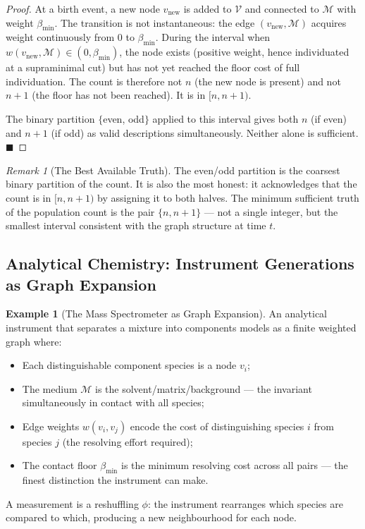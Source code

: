 \documentclass[11pt,twocolumn,a4paper]{article}
\theoremstyle{plain}
\theoremstyle{definition}
\newtheorem{example}[theorem]{Example}
\theoremstyle{remark}
\newtheorem{remark}[theorem]{Remark}
\newcommand{\med}{\mathcal{M}}
\newcommand{\Vcal}{\mathcal{V}}
\newcommand{\bmin}{\beta_{\min}}
\renewcommand{\qed}{\hfill$\blacksquare$}
\begin{document}
\begin{proof}
At a birth event, a new node $v_{\mathrm{new}}$ is added to $\Vcal$ and
connected to $\med$ with weight $\bmin$. The transition is not instantaneous:
the edge $(v_{\mathrm{new}}, \med)$ acquires weight continuously from $0$ to
$\bmin$. During the interval when $w(v_{\mathrm{new}}, \med) \in (0, \bmin)$,
the node exists (positive weight, hence individuated at a supraminimal cut)
but has not yet reached the floor cost of full individuation. The count is
therefore not $n$ (the new node is present) and not $n+1$ (the floor has not
been reached). It is in $[n, n+1)$.

The binary partition $\{$even, odd$\}$ applied to this interval gives both
$n$ (if even) and $n+1$ (if odd) as valid descriptions simultaneously.
Neither alone is sufficient. \qed
\end{proof}

\begin{remark}[The Best Available Truth]
\label{rem:count_truth}
The even/odd partition is the coarsest binary partition of the count. It is
also the most honest: it acknowledges that the count is in $[n, n+1)$ by
assigning it to both halves. The minimum sufficient truth of the population
count is the pair $\{n, n+1\}$ --- not a single integer, but the smallest
interval consistent with the graph structure at time $t$.
\end{remark}

\subsection{Analytical Chemistry: Instrument Generations as Graph Expansion}

\begin{example}[The Mass Spectrometer as Graph Expansion]
\label{ex:ms}
An analytical instrument that separates a mixture into components models as
a finite weighted graph where:
\begin{itemize}
  \item Each distinguishable component species is a node $v_i$;
  \item The medium $\med$ is the solvent/matrix/background --- the invariant
  simultaneously in contact with all species;
  \item Edge weights $w(v_i, v_j)$ encode the cost of distinguishing species
  $i$ from species $j$ (the resolving effort required);
  \item The contact floor $\bmin$ is the minimum resolving cost across all
  pairs --- the finest distinction the instrument can make.
\end{itemize}

A measurement is a reshuffling $\phi$: the instrument rearranges which species
are compared to which, producing a new neighbourhood for each node.
\end{example}
\end{document}
